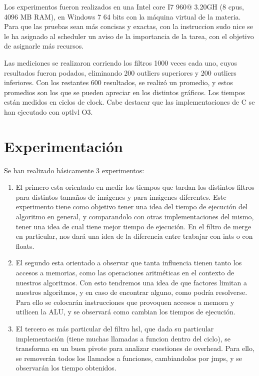 \documentclass[a4paper]{article}
\begin{document}
Los experimentos fueron realizados en una Intel core I7 960@ 3.20GH (8 cpus, 4096 MB RAM), en Windows 7 64 bits con la máquina virtual de la materia. Para que las pruebas sean más concisas y exactas, con la instruccion sudo nice se le ha asignado al scheduler un aviso de la importancia de la tarea, con el objetivo de asignarle más recursos.

Las mediciones se realizaron corriendo los filtros 1000 veces cada uno, cuyos resultados fueron podados, eliminando 200 outliers superiores y 200 outliers inferiores. Con los restantes 600 resultados, se realizó un promedio, y estos promedios son los que se pueden apreciar en los distintos gráficos. Los tiempos están medidos en ciclos de clock. Cabe destacar que las implementaciones de C se han ejecutado con optlvl O3.


\newpage

\section{Experimentación}
 Se han realizado básicamente 3 experimentos:
 
\begin{enumerate}
	\item El primero esta orientado en medir los tiempos que tardan los distintos filtros para distintos tamaños de imágenes y para imágenes diferentes. Este experimento tiene como objetivo tener una idea del tiempo de ejecución del algoritmo en general, y comparandolo con otras implementaciones del mismo, tener una idea de cual tiene mejor tiempo de ejecución. En el filtro de merge en particular, nos dará una idea de la diferencia entre trabajar con ints o con floats.
	\item El segundo esta orientado a observar que tanta influencia tienen tanto los accesos a memorias, como las operaciones aritméticas en el contexto de nuestros algoritmos. Con esto tendremos una idea de que factores limitan a nuestros algoritmos, y en caso de encontrar alguno, como podría resolverse. Para ello se colocarán instrucciones que provoquen accesos a memora y utilicen la ALU, y se observará como cambian los tiempos de ejecución.
	\item El tercero es más particular del filtro hsl, que dada su particular implementación (tiene muchas llamadas a funcion dentro del ciclo), se transforma en un buen pivote para analizar cuestiones de overhead. Para ello, se removerán todos los llamados a funciones, cambiandolos por jmps, y se observarán los tiempo obtenidos.


\end{enumerate}
\end{document}
